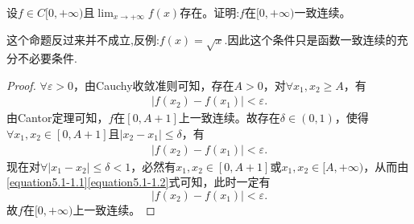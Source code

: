 \documentclass[../../main.tex]{subfiles}%
\begin{document}
\begin{proposition}\label{proposition一致连续的充分不必要条件}
设\(f\in C[0,+\infty)\)且\(\lim_{x\rightarrow +\infty}f(x)\)存在。证明:\(f\)在\([0,+\infty)\)一致连续。
\end{proposition}
\begin{remark}
这个命题反过来并不成立,反例:$f(x)=\sqrt{x}$.因此这个条件只是函数一致连续的充分不必要条件.
\end{remark}
\begin{proof}

\(\forall \varepsilon > 0\)，由Cauchy收敛准则可知，存在\(A > 0\)，对\(\forall x_1, x_2 \geqslant A\)，有
\begin{align}
\left| f(x_2) - f(x_1) \right| < \varepsilon.  \label{equation5.1-1.1}
\end{align}
由Cantor定理可知，\(f\)在\([0, A + 1]\)上一致连续。故存在\(\delta \in (0, 1)\)，使得\(\forall x_1, x_2 \in [0, A + 1]\)且\(\left| x_2 - x_1 \right| \leqslant \delta\)，有
\begin{align}
\left| f(x_2) - f(x_1) \right| < \varepsilon.\label{equation5.1-1.2}
\end{align}
现在对\(\forall \left| x_1 - x_2 \right| \leqslant \delta < 1\)，必然有\(x_1, x_2 \in [0, A + 1]\)或\(x_1, x_2 \in [A, +\infty)\)，从而由\eqref{equation5.1-1.1}\eqref{equation5.1-1.2}式可知，此时一定有
\[
\left| f(x_2) - f(x_1) \right| < \varepsilon.
\]
故\(f\)在\([0, +\infty)\)上一致连续。

\end{proof}
\end{document}

